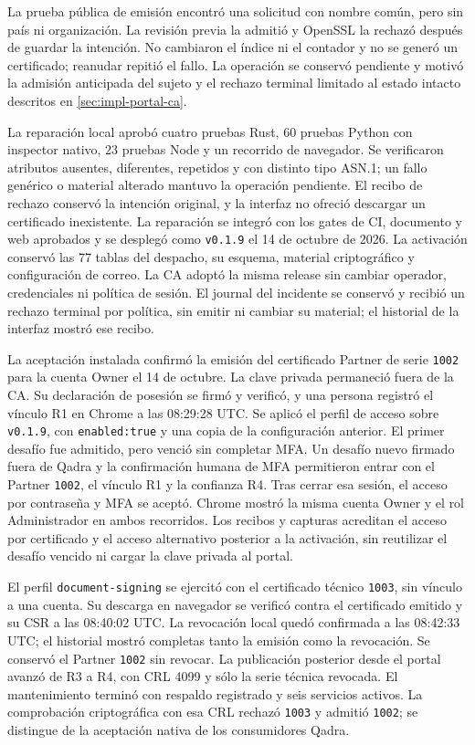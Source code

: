 La prueba p\'ublica de emisi\'on encontr\'o una solicitud con nombre com\'un,
pero sin pa\'is ni organizaci\'on. La revisi\'on previa la admiti\'o y OpenSSL
la rechaz\'o despu\'es de guardar la intenci\'on. No cambiaron el \'indice ni
el contador y no se gener\'o un certificado; reanudar repiti\'o el fallo. La
operaci\'on se conserv\'o pendiente y motiv\'o la admisi\'on anticipada del sujeto
y el rechazo terminal limitado al estado intacto descritos en
\cref{sec:impl-portal-ca}.

La reparaci\'on local aprob\'o cuatro pruebas Rust, 60 pruebas Python con
inspector nativo, 23 pruebas Node y un recorrido de navegador. Se verificaron
atributos ausentes, diferentes, repetidos y con distinto tipo ASN.1; un fallo
gen\'erico o material alterado mantuvo la operaci\'on pendiente. El recibo de
rechazo conserv\'o la intenci\'on original, y la interfaz no ofreci\'o descargar
un certificado inexistente. La reparaci\'on se integr\'o con los gates de CI,
documento y web aprobados y se despleg\'o como \texttt{v0.1.9} el 14 de octubre
de 2026. La activaci\'on conserv\'o las 77 tablas del despacho, su esquema,
material criptogr\'afico y configuraci\'on de correo. La CA adopt\'o la misma
release sin cambiar operador, credenciales ni pol\'itica de sesi\'on. El journal
del incidente se conserv\'o y recibi\'o un rechazo terminal por pol\'itica, sin
emitir ni cambiar su material; el historial de la interfaz mostr\'o ese recibo.

La aceptaci\'on instalada confirm\'o la emisi\'on del certificado Partner de
serie \texttt{1002} para la cuenta Owner el 14 de octubre.
La clave privada permaneci\'o fuera de la CA. Su declaraci\'on de posesi\'on se
firm\'o y verific\'o, y una persona registr\'o el v\'inculo R1 en Chrome a las
08:29:28 UTC. Se aplic\'o el perfil de acceso sobre \texttt{v0.1.9}, con
\texttt{enabled:true} y una copia de la configuraci\'on anterior. El primer
desaf\'io fue admitido, pero venci\'o sin completar MFA. Un desaf\'io nuevo
firmado fuera de Qadra y la confirmaci\'on humana de MFA permitieron entrar
con el Partner \texttt{1002}, el v\'inculo R1 y la confianza
R4. Tras cerrar esa sesi\'on, el acceso por contrase\~na y MFA se acept\'o.
Chrome mostr\'o la misma cuenta Owner y el rol Administrador en ambos recorridos. Los recibos y capturas acreditan el acceso por certificado y
el acceso alternativo posterior a la activaci\'on, sin reutilizar el desaf\'io
vencido ni cargar la clave privada al portal.

El perfil \texttt{document-signing} se ejercit\'o con el certificado t\'ecnico
\texttt{1003}, sin v\'inculo a una cuenta. Su descarga en navegador se verific\'o
contra el certificado emitido y su CSR a las 08:40:02 UTC. La revocaci\'on local
qued\'o confirmada a las 08:42:33 UTC; el historial mostr\'o completas tanto
la emisi\'on como la revocaci\'on. Se conserv\'o el Partner \texttt{1002} sin
revocar. La publicaci\'on posterior desde el portal avanz\'o de R3 a R4,
con CRL 4099 y s\'olo la serie t\'ecnica revocada. El mantenimiento termin\'o
con respaldo registrado y seis servicios activos. La comprobaci\'on criptogr\'afica
con esa CRL rechaz\'o \texttt{1003} y admiti\'o \texttt{1002}; se distingue
de la aceptaci\'on nativa de los consumidores Qadra.

